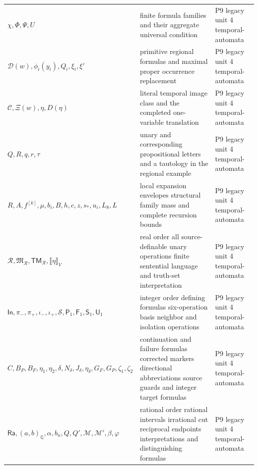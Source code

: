 \begin{longtable}{@{}p{}p{}p{}@{}}
\(\chi,\allowbreak \Phi,\allowbreak \Psi,\allowbreak U\) & finite formula families and their aggregate universal condition & P9 legacy unit 4 temporal-\allowbreak{}automata \\
\(\mathcal D(w),\allowbreak \phi_i(y_i),\allowbreak Q_i,\allowbreak \xi_i,\allowbreak \xi'\) & primitive regional formulas and maximal proper occurrence replacement & P9 legacy unit 4 temporal-\allowbreak{}automata \\
\(\mathcal C,\allowbreak \Xi(w),\allowbreak \eta,\allowbreak D(\eta)\) & literal temporal image class and the completed one-variable translation & P9 legacy unit 4 temporal-\allowbreak{}automata \\
\(Q,\allowbreak R,\allowbreak q,\allowbreak r,\allowbreak \tau\) & unary and corresponding propositional letters and a tautology in the regional example & P9 legacy unit 4 temporal-\allowbreak{}automata \\
\(R,\allowbreak A,\allowbreak f^{[k]},\allowbreak \mu,\allowbreak b_i,\allowbreak B,\allowbreak h,\allowbreak c,\allowbreak z,\allowbreak s_*,\allowbreak u_i,\allowbreak L_8,\allowbreak L\) & local expansion envelopes structural family mass and complete recursion bounds & P9 legacy unit 4 temporal-\allowbreak{}automata \\
\(\mathcal R,\allowbreak \mathfrak M_{\mathcal R},\allowbreak \mathsf{TM}_{\mathcal R},\allowbreak \llbracket\eta\rrbracket_V\) & real order all source-definable unary operations finite sentential language and truth-set interpretation & P9 legacy unit 4 temporal-\allowbreak{}automata \\
\(\mathsf{In},\allowbreak \pi_-,\allowbreak \pi_+,\allowbreak \iota_-,\allowbreak \iota_+,\allowbreak \mathcal S,\allowbreak \mathsf P_1,\allowbreak \mathsf F_1,\allowbreak \mathsf S_1,\allowbreak \mathsf U_1\) & integer order defining formulas six-operation basis neighbor and isolation operations & P9 legacy unit 4 temporal-\allowbreak{}automata \\
\(C,\allowbreak B_P,\allowbreak B_F,\allowbreak \eta_1,\allowbreak \eta_2,\allowbreak \delta,\allowbreak N_\delta,\allowbreak J_\delta,\allowbreak \eta_\delta,\allowbreak G_F,\allowbreak G_P,\allowbreak \zeta_1,\allowbreak \zeta_2\) & continuation and failure formulas corrected markers directional abbreviations source guards and integer target formulas & P9 legacy unit 4 temporal-\allowbreak{}automata \\
\(\mathsf{Ra},\allowbreak (a,\allowbreak b)_{\mathbb Q},\allowbreak \alpha,\allowbreak b_n,\allowbreak Q,\allowbreak Q',\allowbreak \mathcal M,\allowbreak \mathcal M',\allowbreak \beta,\allowbreak \varphi\) & rational order rational intervals irrational cut reciprocal endpoints interpretations and distinguishing formulas & P9 legacy unit 4 temporal-\allowbreak{}automata \\

\end{longtable}
